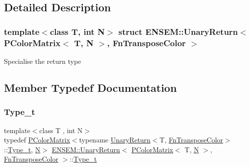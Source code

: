 \subsection{Detailed Description}
\subsubsection*{template$<$class T, int N$>$\newline
struct E\+N\+S\+E\+M\+::\+Unary\+Return$<$ P\+Color\+Matrix$<$ T, N $>$, Fn\+Transpose\+Color $>$}

Specialise the return type 

\subsection{Member Typedef Documentation}
\mbox{\label{structENSEM_1_1UnaryReturn_3_01PColorMatrix_3_01T_00_01N_01_4_00_01FnTransposeColor_01_4_a572cabe45776b7d618458aa2b8d8a7ac}} 
\subsubsection{\texorpdfstring{Type\_t}{Type\_t}\hspace{0.1cm}{\footnotesize\ttfamily [1/3]}}
{\footnotesize\ttfamily template$<$class T , int N$>$ \\
typedef \mbox{\hyperlink{classENSEM_1_1PColorMatrix}{P\+Color\+Matrix}}$<$typename \mbox{\hyperlink{structENSEM_1_1UnaryReturn}{Unary\+Return}}$<$T, \mbox{\hyperlink{structENSEM_1_1FnTransposeColor}{Fn\+Transpose\+Color}}$>$\+::\mbox{\hyperlink{structENSEM_1_1UnaryReturn_3_01PColorMatrix_3_01T_00_01N_01_4_00_01FnTransposeColor_01_4_a572cabe45776b7d618458aa2b8d8a7ac}{Type\+\_\+t}}, \mbox{\hyperlink{adat__devel_2lib_2hadron_2operator__name__util_8cc_a7722c8ecbb62d99aee7ce68b1752f337}{N}}$>$ \mbox{\hyperlink{structENSEM_1_1UnaryReturn}{E\+N\+S\+E\+M\+::\+Unary\+Return}}$<$ \mbox{\hyperlink{classENSEM_1_1PColorMatrix}{P\+Color\+Matrix}}$<$ T, \mbox{\hyperlink{adat__devel_2lib_2hadron_2operator__name__util_8cc_a7722c8ecbb62d99aee7ce68b1752f337}{N}} $>$, \mbox{\hyperlink{structENSEM_1_1FnTransposeColor}{Fn\+Transpose\+Color}} $>$\+::\mbox{\hyperlink{structENSEM_1_1UnaryReturn_3_01PColorMatrix_3_01T_00_01N_01_4_00_01FnTransposeColor_01_4_a572cabe45776b7d618458aa2b8d8a7ac}{Type\+\_\+t}}}


